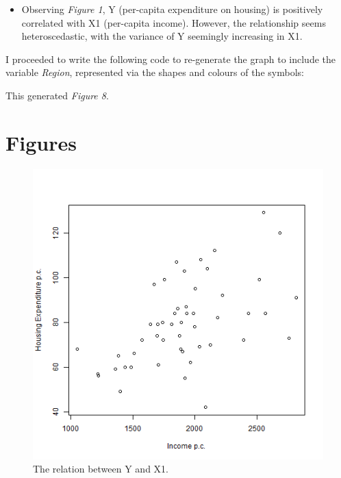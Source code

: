 \documentclass[12pt,letterpaper]{article}
\begin{document}
\begin{itemize}
	\item
	Observing \emph{Figure 1}, Y (per-capita expenditure on housing) is positively correlated with X1 (per-capita income). However, the relationship seems heteroscedastic, with the variance of Y seemingly increasing in X1.
\end{itemize}

I proceeded to write the following code to re-generate the graph to include the variable \emph{Region}, represented via the shapes and colours of the symbols:



This generated \emph{Figure 8}.

\vspace{5cm}

\section*{Figures}

\begin{figure}[h!]\centering
	\caption{\footnotesize The relation between Y and X1.}
	\label{fig:plot_1}
	\includegraphics[width=1\textwidth]{Y_X1.png}
\end{figure}
\end{document}
